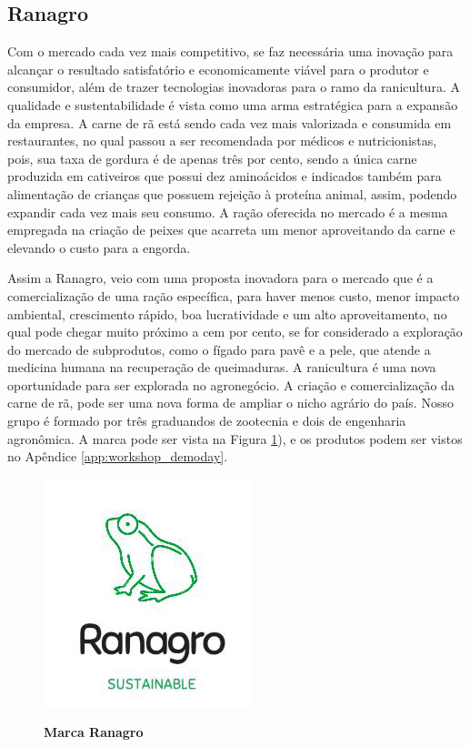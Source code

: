 \subsection{Ranagro}

Com o mercado cada vez mais competitivo, se faz necessária uma inovação para alcançar o resultado satisfatório e economicamente viável para o produtor e consumidor, além de trazer tecnologias inovadoras para o ramo da ranicultura. A qualidade e sustentabilidade é vista como uma arma estratégica para a expansão da empresa. A carne de rã está sendo cada vez mais valorizada e consumida em restaurantes, no qual passou a ser recomendada  por médicos e nutricionistas, pois, sua taxa de gordura é de apenas três por cento, sendo a única carne produzida em cativeiros que possui dez aminoácidos e indicados também para alimentação de crianças que possuem rejeição à proteína animal, assim, podendo expandir cada vez mais seu consumo. A ração oferecida no mercado é a mesma empregada na criação de peixes que acarreta um menor aproveitando da carne e elevando o custo para a engorda.

Assim a Ranagro, veio com uma proposta inovadora para o mercado que é a comercialização de uma ração específica, para haver menos custo, menor impacto ambiental, crescimento rápido, boa lucratividade e um alto aproveitamento, no qual pode chegar muito próximo a cem por cento, se for considerado a exploração do mercado de subprodutos, como o fígado para pavê e a pele, que atende a medicina humana na recuperação de queimaduras. A ranicultura é uma nova oportunidade para ser explorada no agronegócio.  A criação e comercialização da carne de rã, pode ser uma nova forma de ampliar o nicho agrário do país. Nosso grupo é formado por três graduandos de zootecnia e dois de engenharia agronômica. A marca pode ser vista na Figura \ref{figura_26}), e os produtos podem ser vistos no Apêndice \ref{app:workshop_demoday}.



\begin{figure}[H]
\centering
\caption{\textbf{Marca Ranagro}}
\includegraphics[scale=1]{Imagens/ranagro.png}
\label{figura_26}
\end{figure}


